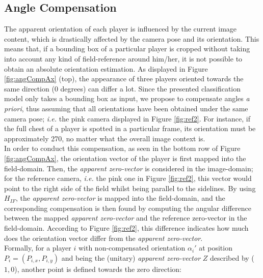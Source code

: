 \documentclass{article}
\newcommand{\cb}[2]{{\sout{#1}}{\color{cyan}#2}}
\begin{document}
\subsection{Angle Compensation}
The apparent orientation of each player is influenced by the current image content, which is drastically affected by the camera pose and its orientation. This means that, if a bounding box of a particular player is cropped without taking into account any kind of field-reference around him/her, it is not possible to obtain an absolute orientation estimation. As displayed in Figure \ref{fig:angCompAx} (top), the appearance of three players oriented towards the same direction (0 degrees) can differ a lot. Since the presented classification model only takes a bounding box as input, we propose to compensate angles \textit{a priori}, thus assuming that all orientations have been obtained under the same camera pose; \textit{i.e.} the pink camera displayed in Figure \ref{fig:ref2}. For instance, if the full chest of a player is spotted in a particular frame, its orientation must be approximately 270, no matter what the overall image context is. \\ 
In order to conduct this compensation, as seen in the bottom row of Figure \ref{fig:angCompAx}, the orientation vector of the player is first mapped into the field-domain. Then, the \textit{apparent zero-vector} is considered in the image-domain; for the reference camera, \textit{i.e.} the pink one in Figure \ref{fig:ref2}, this vector would point to the right side of the field whilst being parallel to the sidelines. By using $H_{IF}$, the \textit{apparent zero-vector} is mapped into the field-domain, and the corresponding compensation is then found by computing the angular difference between the mapped \textit{apparent zero-vector} and the reference zero-vector in the field-domain. According to Figure \ref{fig:ref2}, this difference indicates how much does the orientation vector differ from the \textit{apparent zero-vector}. \\
Formally, for a player $i$ with non-compensated orientation $\alpha_{i}'$ at position $P_{i} = (P_{i,x}, P_{i,y})$ and being the (unitary) \textit{apparent zero-vector} $Z$ described by ($1,0$), another point is defined towards the zero direction: 
\end{document}
